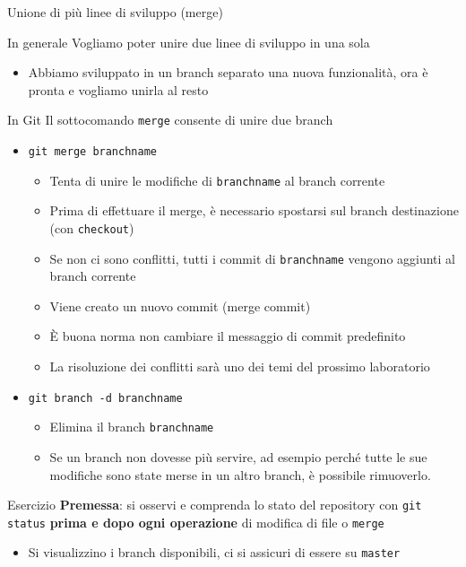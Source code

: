 \documentclass[presentation]{beamer}
\begin{document}
\begin{frame}{Unione di più linee di sviluppo (merge)}
	\begin{block}{In generale}
		Vogliamo poter unire due linee di sviluppo in una sola
		\begin{itemize}
			\item Abbiamo sviluppato in un branch separato una nuova funzionalità, ora è pronta e vogliamo unirla al resto
		\end{itemize}
	\end{block}
	\begin{block}{In Git}
		Il sottocomando \texttt{merge} consente di unire due branch
		\begin{itemize}
			\item \texttt{git merge branchname}
			\begin{itemize}
				\item Tenta di unire le modifiche di \texttt{branchname} al branch corrente
				\item Prima di effettuare il merge, è necessario spostarsi sul branch destinazione (con \texttt{checkout})
				\item Se non ci sono conflitti, tutti i commit di \texttt{branchname} vengono aggiunti al branch corrente
				\item Viene creato un nuovo commit (merge commit)
				\item È buona norma non cambiare il messaggio di commit predefinito
				\item La risoluzione dei conflitti sarà uno dei temi del prossimo laboratorio
			\end{itemize}
			\item \texttt{git branch -d branchname}
			\begin{itemize}
				\item Elimina il branch \texttt{branchname}
				\item Se un branch non dovesse più servire, ad esempio perché tutte le sue modifiche sono state merse in un altro branch, è possibile rimuoverlo.
			\end{itemize}
		\end{itemize}
	\end{block}
	\begin{block}{Esercizio}	
		\textbf{Premessa}: si osservi e comprenda lo stato del repository con \texttt{git status} \textbf{prima e dopo ogni operazione} di modifica di file o \texttt{merge}
		\begin{itemize}
			\footnotesize
			\item Si visualizzino i branch disponibili, ci si assicuri di essere su \texttt{master}

\end{itemize}
\end{block}
\end{frame}
\end{document}
